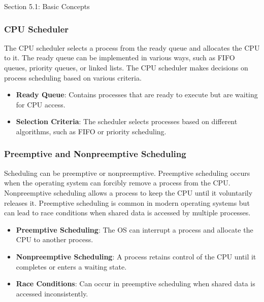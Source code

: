 \begin{notes}{Section 5.1: Basic Concepts}
    \subsubsection*{CPU Scheduler}
    
    The CPU scheduler selects a process from the ready queue and allocates the CPU to it. The ready queue can be implemented in various ways, such as FIFO queues, priority queues, or linked lists. The 
    CPU scheduler makes decisions on process scheduling based on various criteria.
    
    \begin{highlight}
    
        \begin{itemize}
            \item \textbf{Ready Queue}: Contains processes that are ready to execute but are waiting for CPU access.
            \item \textbf{Selection Criteria}: The scheduler selects processes based on different algorithms, such as FIFO or priority scheduling.
        \end{itemize}
    
    \end{highlight}
    
    \subsubsection*{Preemptive and Nonpreemptive Scheduling}
    
    Scheduling can be preemptive or nonpreemptive. Preemptive scheduling occurs when the operating system can forcibly remove a process from the CPU. Nonpreemptive scheduling allows a process to keep the 
    CPU until it voluntarily releases it. Preemptive scheduling is common in modern operating systems but can lead to race conditions when shared data is accessed by multiple processes.
    
    \begin{highlight}
    
        \begin{itemize}
            \item \textbf{Preemptive Scheduling}: The OS can interrupt a process and allocate the CPU to another process.
            \item \textbf{Nonpreemptive Scheduling}: A process retains control of the CPU until it completes or enters a waiting state.
            \item \textbf{Race Conditions}: Can occur in preemptive scheduling when shared data is accessed inconsistently.
        \end{itemize}
    

\end{highlight}
\end{notes}

